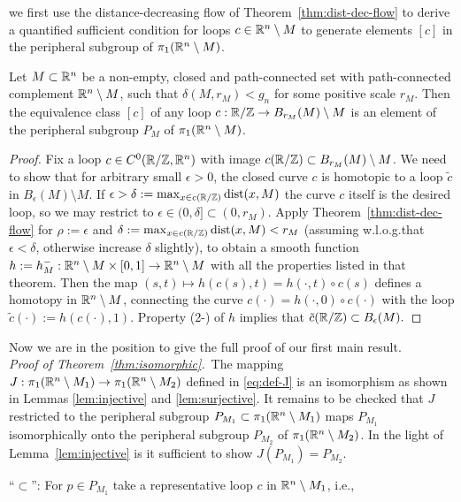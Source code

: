 we first use the distance-decreasing flow of Theorem~\ref{thm:dist-dec-flow}
to derive a quantified sufficient condition for loops $c\in \mathbb{R}^n\setminus M$
to generate elements $[c]$ in the peripheral subgroup of $\pi_1(\mathbb{R}^n\setminus M)$.
\begin{proposition}
\label{prop:elements-peripheral}
Let $M\subset\mathbb{R}^n$ be a non-empty, closed and path-connected set with path-connected
complement $\mathbb{R}^n\setminus M$, such that $\delta(M,r_M)<g_n$ for some positive
scale $r_M$. Then the equivalence class $[c]$ of any loop $c:\mathbb{R}/\mathbb{Z}\to
B_{r_M}(M)\setminus M$ is an element of the peripheral subgroup
$P_M$ of $\pi_1(\mathbb{R}^n\setminus M)$.
\begin{proof}
Fix a loop $c\in C^0(\mathbb{R}/\mathbb{Z},\mathbb{R}^n)$ with image $c(\mathbb{R}/\mathbb{Z})\subset B_{r_M}(M)\setminus M$. We
need to show that for arbitrary small $\epsilon >0$, the closed curve $c$ is homotopic
to a loop $\tilde{c}$ in $B_\epsilon(M)\setminus M$. If $\epsilon> 
\delta:=\max_{x\in c(\mathbb{R}/\mathbb{Z})}\operatorname{dist}(x,M)$
the curve
$c$ itself is the desired loop, so we may restrict to $\epsilon \in 
(0,\delta]\subset (0,r_M)$.
Apply Theorem~\ref{thm:dist-dec-flow} for $\rho:=\epsilon$ and
$\delta:=\max_{x\in c(\mathbb{R}/\mathbb{Z})}\operatorname{dist}(x,M)<r_M$ (assuming w.l.o.g.\@ that 
$\epsilon<\delta$, otherwise increase $\delta$ slightly),
to obtain a smooth function
$h:=h_M^-:\mathbb{R}^n\setminus M\times [0,1]\to\mathbb{R}^n\setminus M$ with all the properties
listed in that theorem. Then the map $(s,t)\mapsto h(c(s),t)
=h(\cdot,t)\circ c(s)$ defines a homotopy in $\mathbb{R}^n\setminus M$,
connecting the curve $c(\cdot)
=h(\cdot,0)\circ c(\cdot)$ with the loop $\tilde{c}(\cdot):=h(c(\cdot),1).$ Property
(2-) of $h$ implies that $\tilde{c}(\mathbb{R}/\mathbb{Z})\subset B_\epsilon(M).$
\end{proof}
\end{proposition}
Now we are in the position to give the full 
proof of our first main result.\\
{\it Proof of Theorem~\ref{thm:isomorphic}.}\,
The mapping $J:\pi_1(\mathbb{R}^n\setminus M_1)\to\pi_1(\mathbb{R}^n\setminus M_2)$ defined in
\eqref{eq:def-J} is an isomorphism as shown in Lemmas \ref{lem:injective} and
\ref{lem:surjective}. It remains to be checked that $J$ restricted to the
peripheral subgroup $P_{M_1}\subset\pi_1(\mathbb{R}^n\setminus M_1) $ maps $P_{M_1}$
isomorphically onto the peripheral subgroup $P_{M_2}$ of $\pi_1(\mathbb{R}^n\setminus M_2)$.
In the light of Lemma~\ref{lem:injective} is it sufficient 
to show $J(P_{M_1}) = P_{M_2}$.\par
``$\subset$'':
For $p\in P_{M_1}$ take a representative loop $c$ in $\mathbb{R}^n\setminus M_1$, i.e., 

